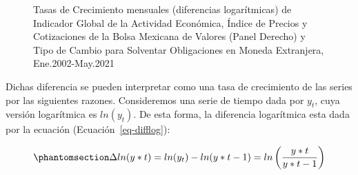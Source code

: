 \documentclass[
  a4paper,
]{article}
\begin{document}
\begin{figure}

\caption{\label{fig-fig5}Tasas de Crecimiento mensuales (diferencias
logarítmicas) de Indicador Global de la Actividad Económica, Índice de
Precios y Cotizaciones de la Bolsa Mexicana de Valores (Panel Derecho) y
Tipo de Cambio para Solventar Obligaciones en Moneda Extranjera,
Ene.2002-May.2021}

\begin{minipage}{\linewidth}



\end{minipage}%
\newline
\begin{minipage}{\linewidth}



\end{minipage}%
\newline
\begin{minipage}{\linewidth}



\end{minipage}%

\end{figure}%

Dichas diferencia se pueden interpretar como una tasa de crecimiento de
las series por las siguientes razones. Consideremos una serie de tiempo
dada por \(y_t\), cuya versión logarítmica es \(ln(y_t)\). De esta
forma, la diferencia logarítmica esta dada por la ecuación
(Ecuación~\ref{eq-difflog}):

\begin{equation}\phantomsection\label{eq-difflog}{
\Delta ln(y*t) = ln(y_t) - ln(y*{t-1}) = ln \left( \frac{y*t}{y*{t-1}} \right)
}\end{equation}
\end{document}
